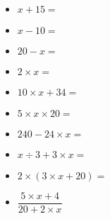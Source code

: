 \begin{multicols}{3}
\begin{itemize}[label={$\bullet$}]
  \item $x + 15 = $ \dotfill
  \item $x - 10 = $ \dotfill
  \item $20 - x = $ \dotfill
  \item $2 \times x = $ \dotfill
  \item $10 \times x + 34 = $ \dotfill
  \item $5 \times  x \times 20 = $ \dotfill
  \item $240 - 24 \times x = $ \dotfill
  \item $x \div 3 + 3 \times x = $ \dotfill
  \item $2 \times (3  \times x + 20) = $ \dotfill
  \item $\dfrac{5 \times x + 4}{20 + 2 \times x}$ \dotfill
\end{itemize}

\end{multicols}

\vspace{0.5cm}

